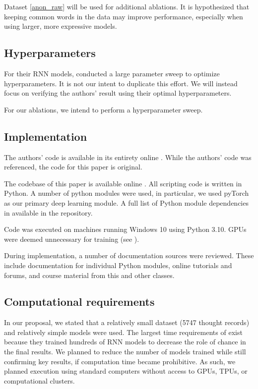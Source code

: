 \documentclass[11pt,a4paper]{article}
\begin{document}
Dataset \ref{anon_raw} will be used for additional ablations. It is hypothesized that keeping common words in the data may improve performance, especially when using larger, more expressive models. 

\subsection{Hyperparameters}
For their RNN models, \citeauthor{burger_2021} conducted a large parameter sweep to optimize hyperparameters. It is not our intent to duplicate this effort. We will instead focus on verifying the authors' result using their optimal hyperparameters.

For our ablations, we intend to perform a hyperparameter sweep. 



\subsection{Implementation}
The authors' code is available in its entirety online \citep{burger_2021_data}. While the authors' code was referenced, the code for this paper is original. 

The codebase of this paper is available online \citep{cs598_repo}. All scripting code is written in Python. A number of python modules were used, in particular, we used pyTorch as our primary deep learning module. A full list of Python module dependencies in available in the repository. 

Code was executed on machines running Windows 10 using Python 3.10. GPUs were deemed unnecessary for training (see ). 

During implementation, a number of documentation sources were reviewed. These include documentation for individual Python modules, online tutorials and forums, and course material from this and other classes.  

\subsection{Computational requirements}
\label{comp_reqs}

In our proposal, we stated that a relatively small dataset (5747 thought records) and relatively simple models were used. 
The largest time requirements of \citet{burger_2021} exist because they trained hundreds of RNN models to decrease the role of chance in the final results. We planned to reduce the number of models trained while still confirming key results, if computation time became prohibitive. As such, we planned execution using standard computers without access to GPUs, TPUs, or computational clusters. 
\end{document}
